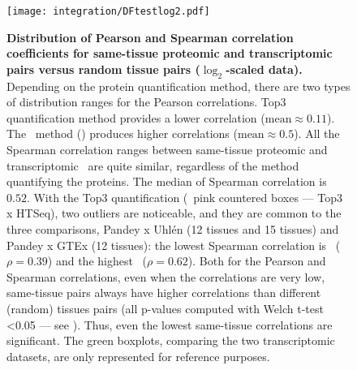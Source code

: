 \begin{figure}[!htbp]
    \texttt{[image: integration/DFtestlog2.pdf]}\centering
    \vspace{-4mm}
    \caption[Distribution of Pearson and Spearman correlation coefficients
    for same-tissue proteomic and transcriptomic pairs
    versus random tissue pairs]{\label{fig:TestSig}\textbf{Distribution of
    Pearson and Spearman correlation coefficients
    for same-tissue proteomic and transcriptomic pairs versus random tissue
    pairs ($\log_2$-scaled data).} Depending on the protein quantification method,
    there are two types of distribution ranges for the Pearson correlations.
    Top3 quantification method provides a lower correlation ($\text{mean} \approx 0.11$).
    The \PPKM\ method () produces higher correlations
    ($\text{mean} \approx 0.5$).
    All the Spearman correlation ranges between same-tissue proteomic and
    transcriptomic \treps\ are quite similar,
    regardless of the method quantifying the proteins.
    The median of Spearman correlation is $0.52$.
    With the Top3 quantification (\ie\ pink countered boxes --- Top3 x HTSeq),
    two outliers are noticeable, and they are common to the three comparisons,
    Pandey x Uhlén (12 tissues and 15 tissues) and Pandey x GTEx (12 tissues):
    the lowest Spearman correlation is \Oesophagus\ ($\rho=0.39$)
    and the highest \liver\ ($\rho=0.62$).
    Both for the Pearson and Spearman correlations,
    even when the correlations are very low,
    same-tissue pairs always have higher correlations than
    different (random) tissues pairs
    (all p-values computed with Welch t-test <0.05 --- see ).
    Thus, even the lowest same-tissue correlations are significant.
    The green boxplots, comparing the two transcriptomic datasets,
    are only represented for reference purposes.}
\end{figure}

